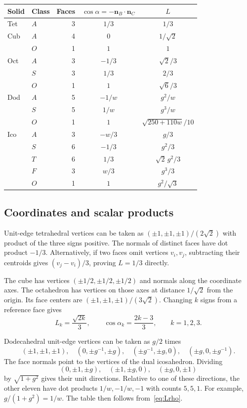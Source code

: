 \documentclass[11pt]{article}
\theoremstyle{definition}
\newcommand{\nb}{\mathbf n_B}
\newcommand{\nc}{\mathbf n_C}
\begin{document}
\begin{center}
\small\renewcommand{\arraystretch}{1.4}
\begin{tabular}{@{}llrcc@{}}
\toprule
Solid & Class & Faces & $\cos\alpha=-\nb\cdot\nc$ & $L$\\
\midrule
Tet & $A$ & 3 & $1/3$ & $1/3$\\
Cub & $A$ & 4 & $0$ & $1/\sqrt2$\\
    & $O$ & 1 & $1$ & $1$\\
Oct & $A$ & 3 & $-1/3$ & $\sqrt2/3$\\
    & $S$ & 3 & $1/3$ & $2/3$\\
    & $O$ & 1 & $1$ & $\sqrt6/3$\\
Dod & $A$ & 5 & $-1/w$ & $g^2/w$\\
    & $S$ & 5 & $1/w$ & $g^3/w$\\
    & $O$ & 1 & $1$ & $\sqrt{250+110w}/10$\\
Ico & $A$ & 3 & $-w/3$ & $g/3$\\
    & $S$ & 6 & $-1/3$ & $g^2/3$\\
    & $T$ & 6 & $1/3$ & $\sqrt2\,g^2/3$\\
    & $F$ & 3 & $w/3$ & $g^3/3$\\
    & $O$ & 1 & $1$ & $g^2/\sqrt3$\\
\bottomrule
\end{tabular}
\end{center}

\subsection{Coordinates and scalar products}
Unit-edge tetrahedral vertices can be taken as
$(\pm1,\pm1,\pm1)/(2\sqrt2)$ with product of the three signs positive.
The normals of distinct faces have dot product $-1/3$. Alternatively, if
two faces omit vertices $v_i,v_j$, subtracting their centroids gives
$(v_j-v_i)/3$, proving $L=1/3$ directly.

The cube has vertices $(\pm1/2,\pm1/2,\pm1/2)$ and normals along the
coordinate axes. The octahedron has vertices on those axes at distance
$1/\sqrt2$ from the origin. Its face centers are
$(\pm1,\pm1,\pm1)/(3\sqrt2)$. Changing $k$ signs from a reference face gives
\begin{equation}\label{eq:octgeometry}
 L_k=\frac{\sqrt{2k}}3,\qquad \cos\alpha_k=\frac{2k-3}{3},
 \qquad k=1,2,3.
\end{equation}

Dodecahedral unit-edge vertices can be taken as $g/2$ times
\[
 (\pm1,\pm1,\pm1),\quad
 (0,\pm g^{-1},\pm g),\quad
 (\pm g^{-1},\pm g,0),\quad
 (\pm g,0,\pm g^{-1}).
\]
The face normals point to the vertices of the dual icosahedron. Dividing
\[
 (0,\pm1,\pm g),\quad(\pm1,\pm g,0),\quad(\pm g,0,\pm1)
\]
by $\sqrt{1+g^2}$ gives their unit directions. Relative to one of these
directions, the other eleven have dot products $1/w,-1/w,-1$ with counts
$5,5,1$. For example,
$g/(1+g^2)=1/w$. The table then follows from~\eqref{eq:Lrho}.
\end{document}
